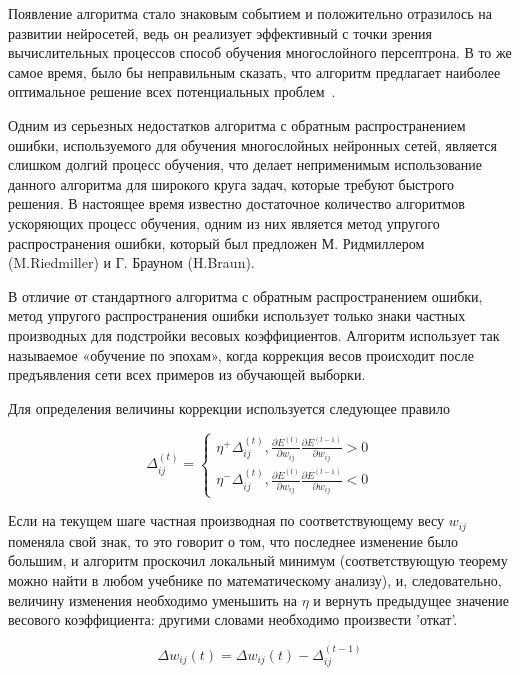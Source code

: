 Появление алгоритма стало знаковым событием и положительно отразилось на развитии нейросетей, ведь он реализует
эффективный с точки зрения вычислительных процессов способ обучения многослойного персептрона. В то же самое время,
было бы неправильным сказать, что алгоритм предлагает наиболее оптимальное решение всех потенциальных
проблем~\cite{Back_propagation_algorithm}.


Одним из серьезных недостатков алгоритма с обратным распространением ошибки, используемого для обучения многослойных
нейронных сетей, является слишком долгий процесс обучения, что делает неприменимым использование данного алгоритма для
широкого круга задач, которые требуют быстрого решения. В настоящее время известно достаточное количество алгоритмов
ускоряющих процесс обучения, одним из них является метод упругого распространения ошибки, который был
предложен М. Ридмиллером (M.Riedmiller) и Г. Брауном (H.Braun).

В отличие от стандартного алгоритма с обратным распространением ошибки, метод упругого распространения ошибки
использует только знаки частных производных для подстройки весовых коэффициентов. Алгоритм использует так называемое
«обучение по эпохам», когда коррекция весов происходит после предъявления сети всех примеров из обучающей выборки.

Для определения величины коррекции используется следующее правило

\begin{equation}
	{\Delta}_{ij}^{(t)} = \begin{cases} \eta^+ {\Delta}_{ij}^{(t)}, \frac{\partial {E}^{(t)}}{\partial {w}_{ij}} \frac{\partial {E}^{(t-1)}}{\partial {w}_{ij}} > 0\\ \eta^- {\Delta}_{ij}^{(t)}, \frac{\partial {E}^{(t)}}{\partial {w}_{ij}} \frac{\partial {E}^{(t-1)}}{\partial {w}_{ij}} < 0 \end{cases}
\end{equation}

Если на текущем шаге частная производная по соответствующему весу $w_{ij}$ поменяла свой знак, то это говорит о том,
что последнее изменение было большим, и алгоритм проскочил локальный минимум (соответствующую теорему можно найти в
любом учебнике по математическому анализу), и, следовательно, величину изменения необходимо уменьшить на $\eta$ и
вернуть предыдущее значение весового коэффициента: другими словами необходимо произвести 'откат'.

\begin{equation}
	{\Delta} w_{ij}(t) = {\Delta} w_{ij}(t) - {\Delta}_{ij}^{(t-1)}
\end{equation}

